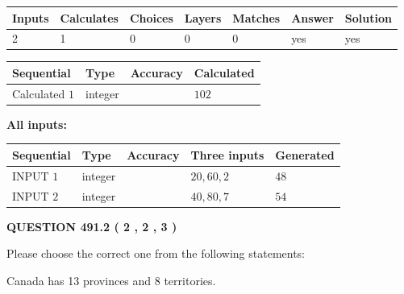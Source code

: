 \documentclass[12pt]{article}
\begin{document}
 

 
   
   
   
   
\noindent\begin{tabular}{|l|l|l|l|l|l|l|}
 \hline
Inputs & Calculates & Choices & Layers & Matches & Answer & Solution \\ \hline
 2  & 
 1  & 
 0
  & 
 0  & 
 0  & 
  yes & 
  yes 
  \\ \hline
 \end{tabular}
   
   
   
   
\noindent{}
   
   
  
  
\noindent\begin{tabular}{|l|l|l|l|}
\hline
 Sequential & Type & Accuracy & Calculated \\ 
\hline
 
 
  Calculated $  1 $ & integer &  & 
  $ 102 $ 
 \\  \hline  
 \end{tabular}
   
   
   
   
\noindent\vspace{0.1in}\hspace{-0.08in} {\textbf{\Large{All inputs: }}}
   
   
  
  
\noindent\begin{tabular}{|l|l|l|l|l|}
\hline
 Sequential & Type & Accuracy & Three inputs & Generated \\ 
\hline
 
 
  INPUT $  1 $ & integer &  & $
 20
 , 
 60
 , 
 2
 $ & $ 48 $ 
 \\  \hline  
 
 
  INPUT $  2 $ & integer &  & $
 40
 , 
 80
 , 
 7
 $ & $ 54 $ 
 \\  \hline  
 \end{tabular}
   
   
  
\vspace{0.2in}
  
{\textbf{\Large{QUESTION
491.2 
 ( 2 , 2 , 3 )
}}}
  
  
Please choose the correct one from the following statements:
 
 
Canada has  13 provinces and  8 territories.
 
\end{document}
